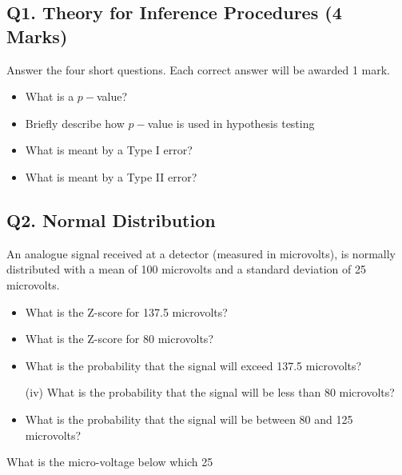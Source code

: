

\subsection*{Q1. Theory for Inference Procedures (4 Marks)}
Answer the four short questions. Each correct answer will be awarded 1 mark.
\begin{itemize}

\item  What is a $p-$value?

\item  Briefly describe how $p-$value is used in hypothesis testing

\item  What is meant by a Type I error?

\item   What is meant by a Type II error?
\end{itemize}


\subsection*{Q2. Normal Distribution }
An analogue signal received at a detector (measured in microvolts), is normally distributed with a mean of 100 microvolts 
and a standard deviation of 25 microvolts.

\begin{itemize}

\item  What is the Z-score for 137.5 microvolts? 

\item  What is the Z-score for 80 microvolts?

\item  What is the probability that the signal will exceed 137.5 microvolts? 

\item[(iv)] What is the probability that the signal will be less than 80 microvolts?

\item   What is the probability that the signal will be between 80 and 125 microvolts?
\end{itemize}

%
\item[(iii)] What is the micro-voltage below which 25%
\item[(4 marks)]

\newpage
